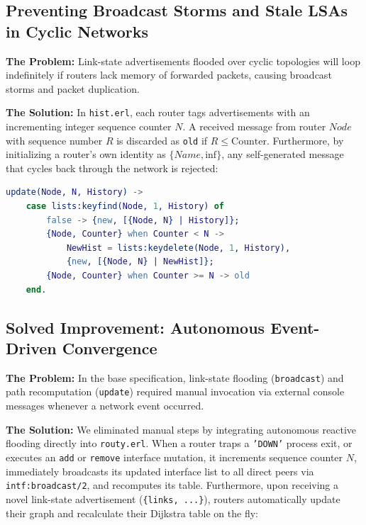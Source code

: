 \documentclass[a4paper, 11pt]{article}
\begin{document}
\subsection{Preventing Broadcast Storms and Stale LSAs in Cyclic Networks}
\textbf{The Problem:} Link-state advertisements flooded over cyclic topologies will loop indefinitely if routers lack memory of forwarded packets, causing broadcast storms and packet duplication.

\textbf{The Solution:} In \texttt{hist.erl}, each router tags advertisements with an incrementing integer sequence counter $N$. A received message from router $Node$ with sequence number $R$ is discarded as \texttt{old} if $R \le \text{Counter}$. Furthermore, by initializing a router's own identity as $\{Name, \text{inf}\}$, any self-generated message that cycles back through the network is rejected:
\begin{lstlisting}[language=erlang]
update(Node, N, History) ->
    case lists:keyfind(Node, 1, History) of
        false -> {new, [{Node, N} | History]};
        {Node, Counter} when Counter < N ->
            NewHist = lists:keydelete(Node, 1, History),
            {new, [{Node, N} | NewHist]};
        {Node, Counter} when Counter >= N -> old
    end.
\end{lstlisting}

\subsection{Solved Improvement: Autonomous Event-Driven Convergence}
\textbf{The Problem:} In the base specification, link-state flooding (\texttt{broadcast}) and path recomputation (\texttt{update}) required manual invocation via external console messages whenever a network event occurred.

\textbf{The Solution:} We eliminated manual steps by integrating autonomous reactive flooding directly into \texttt{routy.erl}. When a router traps a \texttt{'DOWN'} process exit, or executes an \texttt{add} or \texttt{remove} interface mutation, it increments sequence counter $N$, immediately broadcasts its updated interface list to all direct peers via \texttt{intf:broadcast/2}, and recomputes its table. Furthermore, upon receiving a novel link-state advertisement (\texttt{\{links, ...\}}), routers automatically update their graph and recalculate their Dijkstra table on the fly:
\end{document}
